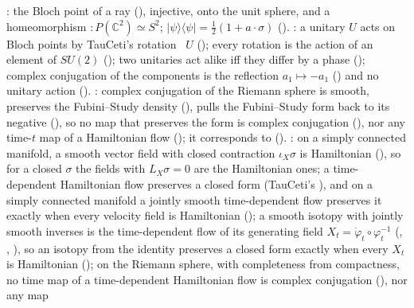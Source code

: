 \documentclass[11pt]{article}
\begin{document}
\begin{itemize}
  : the Bloch point of a ray (), injective, onto the unit
  sphere, and a homeomorphism  $: P(\mathbb C^2) \simeq S^2$;
  $|\psi\rangle\langle\psi| = \frac12(1 + a\cdot\sigma)$ ().\newline
  : a unitary $U$ acts on Bloch points by TauCeti's rotation
  ~$U$ (); every rotation is the action of an
  element of $SU(2)$ (); two unitaries act alike iff they differ by
  a phase (); complex conjugation of the components is the reflection
  $a_1 \mapsto -a_1$ () and no unitary action
  ().\newline
  : complex conjugation  of the Riemann
  sphere is smooth, preserves the Fubini--Study density (), pulls
  the Fubini--Study form back to its negative (), so no map that
  preserves the form is complex conjugation (), nor any time-$t$
  map of a Hamiltonian flow (); it corresponds to
   ().\newline
  : on a simply connected manifold, a smooth vector field with
  closed contraction $\iota_X\sigma$ is Hamiltonian
  (), so for a
  closed $\sigma$ the fields with $L_X\sigma = 0$ are the Hamiltonian ones; a time-dependent
  Hamiltonian flow preserves a closed form (TauCeti's
  ), and on a simply
  connected manifold a jointly smooth time-dependent flow preserves it exactly when every velocity
  field is Hamiltonian (); a smooth
  isotopy with jointly smooth inverses is the time-dependent flow of its generating field
  $X_t = \dot\varphi_t \circ \varphi_t^{-1}$ (, ,
  ), so an isotopy from the identity preserves a closed form
  exactly when every $X_t$ is Hamiltonian ();
  on the Riemann sphere, with completeness from compactness, no time map of a time-dependent
  Hamiltonian flow is complex conjugation (), nor any map

\end{itemize}
\end{document}
